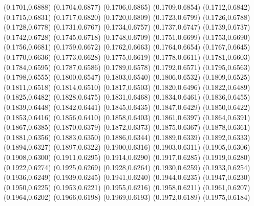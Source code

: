 \PST@Cross(0.1701,0.6888)
\PST@Cross(0.1704,0.6877)
\PST@Cross(0.1706,0.6865)
\PST@Cross(0.1709,0.6854)
\PST@Cross(0.1712,0.6842)
\PST@Cross(0.1715,0.6831)
\PST@Cross(0.1717,0.6820)
\PST@Cross(0.1720,0.6809)
\PST@Cross(0.1723,0.6799)
\PST@Cross(0.1726,0.6788)
\PST@Cross(0.1728,0.6778)
\PST@Cross(0.1731,0.6767)
\PST@Cross(0.1734,0.6757)
\PST@Cross(0.1737,0.6747)
\PST@Cross(0.1739,0.6737)
\PST@Cross(0.1742,0.6728)
\PST@Cross(0.1745,0.6718)
\PST@Cross(0.1748,0.6709)
\PST@Cross(0.1751,0.6699)
\PST@Cross(0.1753,0.6690)
\PST@Cross(0.1756,0.6681)
\PST@Cross(0.1759,0.6672)
\PST@Cross(0.1762,0.6663)
\PST@Cross(0.1764,0.6654)
\PST@Cross(0.1767,0.6645)
\PST@Cross(0.1770,0.6636)
\PST@Cross(0.1773,0.6628)
\PST@Cross(0.1775,0.6619)
\PST@Cross(0.1778,0.6611)
\PST@Cross(0.1781,0.6603)
\PST@Cross(0.1784,0.6595)
\PST@Cross(0.1787,0.6586)
\PST@Cross(0.1789,0.6578)
\PST@Cross(0.1792,0.6571)
\PST@Cross(0.1795,0.6563)
\PST@Cross(0.1798,0.6555)
\PST@Cross(0.1800,0.6547)
\PST@Cross(0.1803,0.6540)
\PST@Cross(0.1806,0.6532)
\PST@Cross(0.1809,0.6525)
\PST@Cross(0.1811,0.6518)
\PST@Cross(0.1814,0.6510)
\PST@Cross(0.1817,0.6503)
\PST@Cross(0.1820,0.6496)
\PST@Cross(0.1822,0.6489)
\PST@Cross(0.1825,0.6482)
\PST@Cross(0.1828,0.6475)
\PST@Cross(0.1831,0.6468)
\PST@Cross(0.1834,0.6461)
\PST@Cross(0.1836,0.6455)
\PST@Cross(0.1839,0.6448)
\PST@Cross(0.1842,0.6441)
\PST@Cross(0.1845,0.6435)
\PST@Cross(0.1847,0.6429)
\PST@Cross(0.1850,0.6422)
\PST@Cross(0.1853,0.6416)
\PST@Cross(0.1856,0.6410)
\PST@Cross(0.1858,0.6403)
\PST@Cross(0.1861,0.6397)
\PST@Cross(0.1864,0.6391)
\PST@Cross(0.1867,0.6385)
\PST@Cross(0.1870,0.6379)
\PST@Cross(0.1872,0.6373)
\PST@Cross(0.1875,0.6367)
\PST@Cross(0.1878,0.6361)
\PST@Cross(0.1881,0.6356)
\PST@Cross(0.1883,0.6350)
\PST@Cross(0.1886,0.6344)
\PST@Cross(0.1889,0.6339)
\PST@Cross(0.1892,0.6333)
\PST@Cross(0.1894,0.6327)
\PST@Cross(0.1897,0.6322)
\PST@Cross(0.1900,0.6316)
\PST@Cross(0.1903,0.6311)
\PST@Cross(0.1905,0.6306)
\PST@Cross(0.1908,0.6300)
\PST@Cross(0.1911,0.6295)
\PST@Cross(0.1914,0.6290)
\PST@Cross(0.1917,0.6285)
\PST@Cross(0.1919,0.6280)
\PST@Cross(0.1922,0.6274)
\PST@Cross(0.1925,0.6269)
\PST@Cross(0.1928,0.6264)
\PST@Cross(0.1930,0.6259)
\PST@Cross(0.1933,0.6254)
\PST@Cross(0.1936,0.6249)
\PST@Cross(0.1939,0.6245)
\PST@Cross(0.1941,0.6240)
\PST@Cross(0.1944,0.6235)
\PST@Cross(0.1947,0.6230)
\PST@Cross(0.1950,0.6225)
\PST@Cross(0.1953,0.6221)
\PST@Cross(0.1955,0.6216)
\PST@Cross(0.1958,0.6211)
\PST@Cross(0.1961,0.6207)
\PST@Cross(0.1964,0.6202)
\PST@Cross(0.1966,0.6198)
\PST@Cross(0.1969,0.6193)
\PST@Cross(0.1972,0.6189)
\PST@Cross(0.1975,0.6184)
